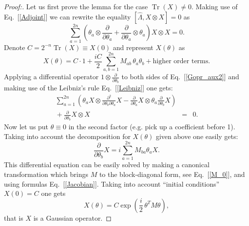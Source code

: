 \documentclass[twocolumn,showpacs,preprintnumbers,superscriptaddress]{revtex4}
\newcommand{\drv}[1]{\frac{\partial}{\partial{#1}}}
\newcommand{\be}{\begin{equation}}
\newcommand{\ee}{\end{equation}}
\newcommand{\nn}{\nonumber}
\newcommand{\Lop}{{\hat{\Lambda}}}
\DeclareMathOperator*{\tr}{\mathop{\mathrm{Tr}}}
\begin{document}
\begin{proof}[Proof:]
Let us first prove the lemma for the case $\tr(X)\ne 0$.
Making use of Eq.~[\ref{Adjoint}] we can rewrite the equality
$[\Lop,X\otimes X]=0$ as
\be\label{Gopr_aux2}
\sum_{a=1}^{2n} 
\left( 
\theta_a\otimes \drv{\theta_a} + \drv{\theta_a}\otimes \theta_a
\right)
X\otimes X =0.
\ee
Denote $C=2^{-n}\tr{(X)}\equiv X(0)$ and represent $X(\theta)$ as
\[
X(\theta)= C\cdot 1 + \frac{iC}2\sum_{a,b=1}^{2n} M_{ab}\,\theta_a \theta_b + 
\mbox{higher order terms}.
\]
Applying a differential operator $1\otimes \drv{\theta_b}$ to both sides
of Eq.~[\ref{Gopr_aux2}] and making use of the Leibniz's rule Eq.~[\ref{Leibniz}]
one gets:
\begin{eqnarray}
\sum_{a=1}^{2n} \left(
\theta_a X \otimes 
\frac{\partial^2}{\partial \theta_b \partial \theta_a} X -
\drv{\theta_a} X \otimes \theta_a\drv{\theta_b} X \right) && \\ \nn
{} + \drv{\theta_b} X \otimes X &=& 0. \nn
\end{eqnarray}
Now let us put $\theta\equiv 0$ in the second factor 
(e.g. pick up a coefficient before 1). Taking into account the
decomposition for $X(\theta)$ given above one easily gets:
\be\label{lin_dif_eq}
\drv{\theta_b} X = i\sum_{a=1}^{2n} M_{ba} \theta_a X.
\ee
This differential equation can be easily solved by making a
canonical transformation which brings $M$ to the block-diagonal
form, see Eq.~[\ref{M_0}], and using formulas Eq.~[\ref{Jacobian}].
Taking into account ``initial conditions'' $X(0)=C$ one gets
\[
X(\theta)=C \exp{\left( \frac{i}2\, \theta^T M \theta \right) },
\]
that is $X$ is a Gaussian operator.


\end{proof}
\end{document}
